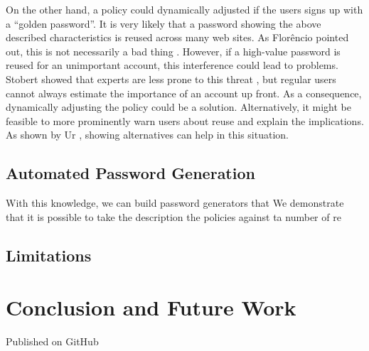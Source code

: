 On the other hand, a policy could dynamically adjusted if the users signs up with a ``golden password''. It is very likely that a password showing the above described characteristics is reused across many web sites. As Florêncio \etal pointed out, this is not necessarily a bad thing \cite{Florencio2014PasswordPortfoliosFiniteUser}. However, if a high-value password is reused for an unimportant account, this interference could lead to problems. Stobert showed that experts are less prone to this threat \cite{Stobert2015ExpertPassword}, but regular users cannot always estimate the importance of an account up front. As a consequence, dynamically adjusting the policy could be a solution. Alternatively, it might be feasible to more prominently warn users about reuse and explain the implications. As shown by Ur \etal, showing alternatives can help in this situation. 

\subsection{Automated Password Generation}
With this knowledge, we can build password generators that 
We demonstrate that it is possible to take the description the policies against ta number of re

\subsection{Limitations}

\section{Conclusion and Future Work}

Published on GitHub 



